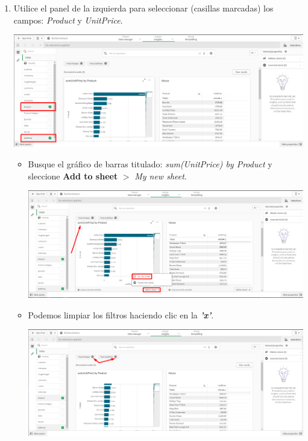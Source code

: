 \documentclass[12pt,letterpaper]{article}
\newcommand\tab[1][1cm]{\hspace*{#1}}
\begin{document}
\begin{enumerate}[\tab 1.]
\begin{center}
        \end{center}
        \item Utilice el panel de la izquierda para seleccionar (casillas marcadas) los campos: \textit{Product} y \textit{UnitPrice}.
        \begin{center}
            \includegraphics[width=13cm]{./img/img10.png}
        \end{center}
        \begin{itemize}
            \item Busque el gráfico de barras titulado: \textit{sum(UnitPrice) by Product} y sleccione \textbf{Add to sheet} $>$  \textit{My new sheet}.
            \begin{center}
                \includegraphics[width=13cm]{./img/img10.1.png}
            \end{center}
            \item Podemos limpiar los filtros haciendo clic en la \textit{\textbf{'x'}}.
            \begin{center}
                \includegraphics[width=13cm]{./img/img10.2.png}

\end{center}
\end{itemize}
\end{enumerate}
\end{document}
